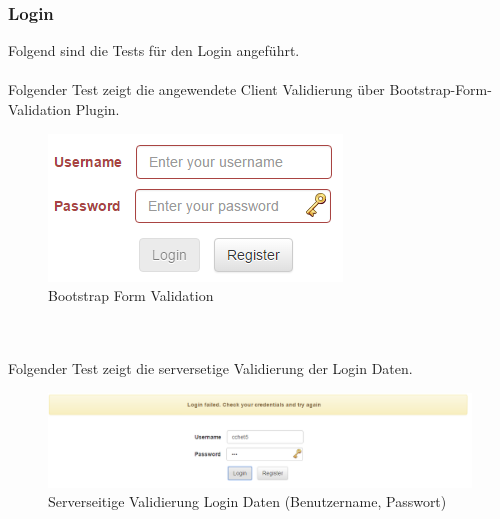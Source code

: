 \documentclass[11pt, a4paper, twoside]{article}   	%
\begin{document}
\subsubsection{Login}
Folgend sind die Tests für den Login angeführt.\\\\
Folgender Test zeigt die angewendete Client Validierung über Bootstrap-Form-Validation Plugin. 
\begin{figure}[h]
	\centering
	\includegraphics[scale=0.5]{images/login_client_validation_full.PNG}
	\caption
	{Bootstrap Form Validation}
\end{figure}\\\\
Folgender Test zeigt die serversetige Validierung der Login Daten.
\begin{figure}[h]
	\centering
	\includegraphics[scale=0.5]{images/login_server_validation_credentials.PNG}
	\caption
	{Serverseitige Validierung Login Daten (Benutzername, Passwort)}
\end{figure}\\\\

\newpage
\end{document}
